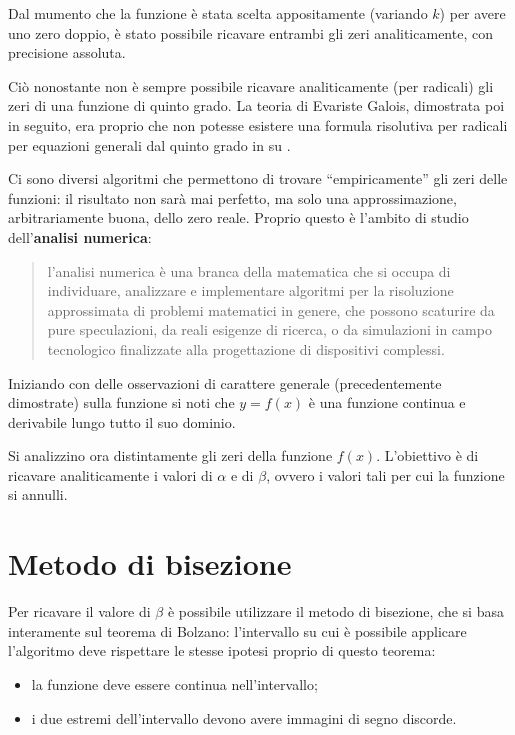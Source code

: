 Dal mumento che la funzione è stata scelta appositamente (variando $k$) per avere uno zero doppio, è stato possibile ricavare entrambi gli zeri analiticamente, con precisione assoluta. 

Ciò nonostante non è sempre possibile ricavare analiticamente (per radicali) gli zeri di una funzione di quinto grado.
La teoria di Evariste Galois, dimostrata poi in seguito, era proprio che non potesse esistere una formula risolutiva per radicali per equazioni generali dal quinto grado in su \parencite[12]{eq:ter}.

Ci sono diversi algoritmi che permettono di trovare ``empiricamente'' gli zeri delle funzioni: il risultato non sarà mai perfetto, ma solo una approssimazione, arbitrariamente buona, dello zero reale.
Proprio questo è l'ambito di studio dell'\textbf{analisi numerica}: 
\begin{quotation}
\noindent l'analisi numerica è una branca della matematica che si occupa di individuare, analizzare e implementare algoritmi per la risoluzione approssimata di problemi matematici in genere, che possono scaturire da pure speculazioni, da reali esigenze di ricerca, o da simulazioni in campo tecnologico finalizzate alla progettazione di dispositivi complessi.
\end{quotation}

Iniziando con delle osservazioni di carattere generale (precedentemente dimostrate) sulla funzione si noti che $y=f(x)$ è una funzione continua e derivabile lungo tutto il suo dominio.

Si analizzino ora distintamente gli zeri della funzione $f(x)$. L'obiettivo è di ricavare analiticamente i valori di $\alpha$ e di $\beta$, ovvero i valori tali per cui la funzione si annulli.

\section{Metodo di bisezione}

Per ricavare il valore di $\beta$ è possibile utilizzare il metodo di bisezione, che si basa interamente sul teorema di Bolzano: l'intervallo su cui è possibile applicare l'algoritmo deve rispettare le stesse ipotesi proprio di questo teorema:
\begin{itemize}
\item la funzione deve essere continua nell'intervallo;
\item i due estremi dell'intervallo devono avere immagini di segno discorde.
\end{itemize}

